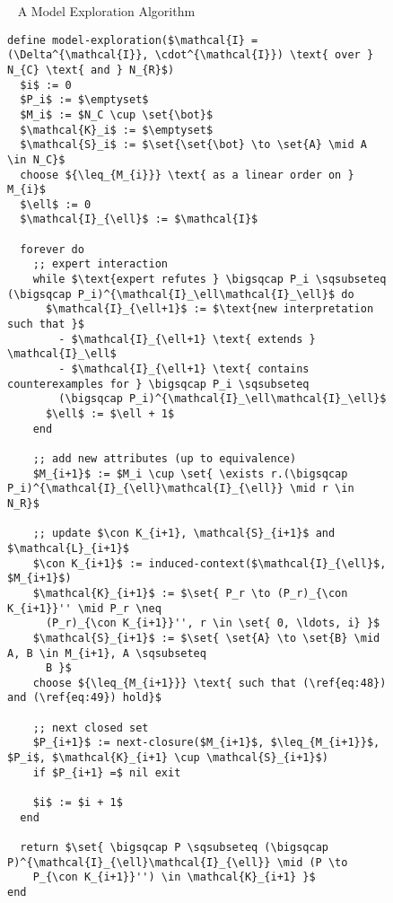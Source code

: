 
\begin{figure}[tp]
  \begin{Algorithm}~ A Model Exploration Algorithm%
    \label{alg:model-exploration}
    \begin{lstlisting}
define model-exploration($\mathcal{I} = (\Delta^{\mathcal{I}}, \cdot^{\mathcal{I}}) \text{ over } N_{C} \text{ and } N_{R}$)
  $i$ := 0
  $P_i$ := $\emptyset$
  $M_i$ := $N_C \cup \set{\bot}$
  $\mathcal{K}_i$ := $\emptyset$
  $\mathcal{S}_i$ := $\set{\set{\bot} \to \set{A} \mid A \in N_C}$
  choose ${\leq_{M_{i}}} \text{ as a linear order on } M_{i}$
  $\ell$ := 0
  $\mathcal{I}_{\ell}$ := $\mathcal{I}$
  
  forever do
    ;; expert interaction
    while $\text{expert refutes } \bigsqcap P_i \sqsubseteq (\bigsqcap P_i)^{\mathcal{I}_\ell\mathcal{I}_\ell}$ do
      $\mathcal{I}_{\ell+1}$ := $\text{new interpretation such that }$
        - $\mathcal{I}_{\ell+1} \text{ extends } \mathcal{I}_\ell$
        - $\mathcal{I}_{\ell+1} \text{ contains counterexamples for } \bigsqcap P_i \sqsubseteq
        (\bigsqcap P_i)^{\mathcal{I}_\ell\mathcal{I}_\ell}$
      $\ell$ := $\ell + 1$
    end

    ;; add new attributes (up to equivalence)
    $M_{i+1}$ := $M_i \cup \set{ \exists r.(\bigsqcap P_i)^{\mathcal{I}_{\ell}\mathcal{I}_{\ell}} \mid r \in N_R}$

    ;; update $\con K_{i+1}, \mathcal{S}_{i+1}$ and $\mathcal{L}_{i+1}$
    $\con K_{i+1}$ := induced-context($\mathcal{I}_{\ell}$, $M_{i+1}$)
    $\mathcal{K}_{i+1}$ := $\set{ P_r \to (P_r)_{\con K_{i+1}}'' \mid P_r \neq
      (P_r)_{\con K_{i+1}}'', r \in \set{ 0, \ldots, i} }$
    $\mathcal{S}_{i+1}$ := $\set{ \set{A} \to \set{B} \mid A, B \in M_{i+1}, A \sqsubseteq
      B }$
    choose ${\leq_{M_{i+1}}} \text{ such that (\ref{eq:48}) and (\ref{eq:49}) hold}$

    ;; next closed set
    $P_{i+1}$ := next-closure($M_{i+1}$, $\leq_{M_{i+1}}$, $P_i$, $\mathcal{K}_{i+1} \cup \mathcal{S}_{i+1}$)
    if $P_{i+1} =$ nil exit

    $i$ := $i + 1$
  end

  return $\set{ \bigsqcap P \sqsubseteq (\bigsqcap P)^{\mathcal{I}_{\ell}\mathcal{I}_{\ell}} \mid (P \to
    P_{\con K_{i+1}}'') \in \mathcal{K}_{i+1} }$
end    
    \end{lstlisting}  
  \end{Algorithm}
\end{figure}


